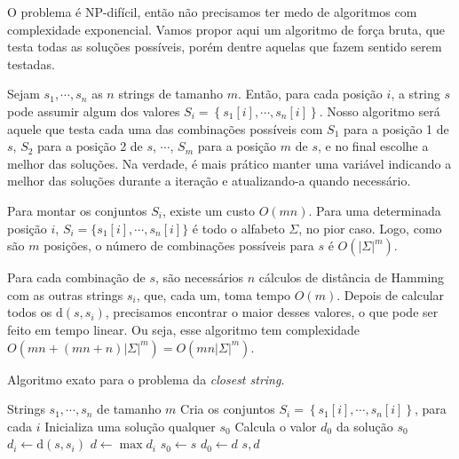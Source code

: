 O problema é NP-difícil, então não precisamos ter medo de algoritmos com complexidade exponencial. Vamos propor aqui um algoritmo de força bruta, que testa todas as soluções possíveis, porém dentre aquelas que fazem sentido serem testadas.

Sejam $s_1, \cdots, s_n$ as $n$ strings de tamanho $m$. Então, para cada posição $i$, a string $s$ pode assumir algum dos valores $S_i = \left\{s_1[i], \cdots, s_n[i]\right\}$. Nosso algoritmo será aquele que testa cada uma das combinações possíveis com $S_1$ para a posição 1 de $s$, $S_2$ para a posição 2 de $s$, $\cdots$, $S_m$ para a posição $m$ de $s$, e no final escolhe a melhor das soluções. Na verdade, é mais prático manter uma variável indicando a melhor das soluções durante a iteração e atualizando-a quando necessário.

Para montar os conjuntos $S_i$, existe um custo $O(mn)$. Para uma determinada posição $i$, $S_i = \{s_1[i], \cdots, s_n[i]\}$ é todo o alfabeto $\Sigma$, no pior caso. Logo, como são $m$ posições, o número de combinações possíveis para $s$ é $O(|\Sigma|^m)$.

Para cada combinação de $s$, são necessários $n$ cálculos de distância de Hamming com as outras strings $s_i$, que, cada um, toma tempo $O(m)$.
Depois de calcular todos os $\text{d}(s, s_i)$, precisamos encontrar o maior desses valores, o que pode ser feito em tempo linear.
Ou seja, esse algoritmo tem complexidade $O(mn + (mn+n)|\Sigma|^m) = O(mn|\Sigma|^m)$.

\begin{algorithm}
    \caption{Algoritmo exato para o problema da \textit{closest string}.}
    \label{alg:local_search}
    \begin{algorithmic}
        \Require Strings $s_1, \cdots, s_n$ de tamanho $m$
        \State Cria os conjuntos $S_i = \left\{s_1[i], \cdots, s_n[i]\right\}$, para cada $i$
        \State Inicializa uma solução qualquer $s_0$
        \State Calcula o valor $d_0$ da solução $s_0$
                \State $d_i \gets \text{d}(s, s_i)$
            \EndFor
            \State $d \gets \max d_i$
                \State $s_0 \gets s$
                \State $d_0 \gets d$
            \EndIf
        \EndFor
        \State \Return $s, d$
    \end{algorithmic}
\end{algorithm}